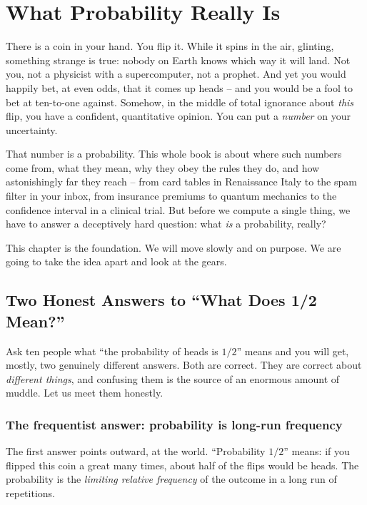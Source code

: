 \chapter{What Probability Really Is}

There is a coin in your hand. You flip it. While it spins in the air, glinting,
something strange is true: nobody on Earth knows which way it will land. Not you,
not a physicist with a supercomputer, not a prophet. And yet you would happily
bet, at even odds, that it comes up heads -- and you would be a fool to bet at
ten-to-one against. Somehow, in the middle of total ignorance about \emph{this}
flip, you have a confident, quantitative opinion. You can put a \emph{number} on
your uncertainty.

That number is a probability. This whole book is about where such numbers come
from, what they mean, why they obey the rules they do, and how astonishingly far
they reach -- from card tables in Renaissance Italy to the spam filter in your
inbox, from insurance premiums to quantum mechanics to the confidence interval
in a clinical trial. But before we compute a single thing, we have to answer a
deceptively hard question: what \emph{is} a probability, really?

This chapter is the foundation. We will move slowly and on purpose. We are going
to take the idea apart and look at the gears.

\section{Two Honest Answers to ``What Does 1/2 Mean?''}
\label{ch01:two-answers}

Ask ten people what ``the probability of heads is $1/2$'' means and you will get,
mostly, two genuinely different answers. Both are correct. They are correct about
\emph{different things}, and confusing them is the source of an enormous amount of
muddle. Let us meet them honestly.

\subsection{The frequentist answer: probability is long-run frequency}
\label{ch01:frequentist}

The first answer points outward, at the world. ``Probability $1/2$'' means: if you
flipped this coin a great many times, about half of the flips would be heads. The
probability is the \emph{limiting relative frequency} of the outcome in a long
run of repetitions.

